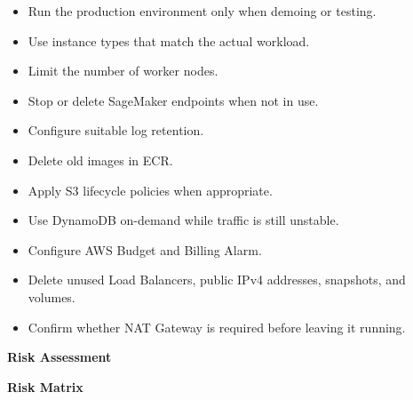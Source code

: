 \begin{itemize}
\tightlist
\item
  Run the production environment only when demoing or testing.
\item
  Use instance types that match the actual workload.
\item
  Limit the number of worker nodes.
\item
  Stop or delete SageMaker endpoints when not in use.
\item
  Configure suitable log retention.
\item
  Delete old images in ECR.
\item
  Apply S3 lifecycle policies when appropriate.
\item
  Use DynamoDB on-demand while traffic is still unstable.
\item
  Configure AWS Budget and Billing Alarm.
\item
  Delete unused Load Balancers, public IPv4 addresses, snapshots, and
  volumes.
\item
  Confirm whether NAT Gateway is required before leaving it running.
\end{itemize}

\vspace{0.5em}\noindent\textbf{Risk Assessment}\par

\vspace{0.5em}\noindent\textbf{Risk Matrix}\par

